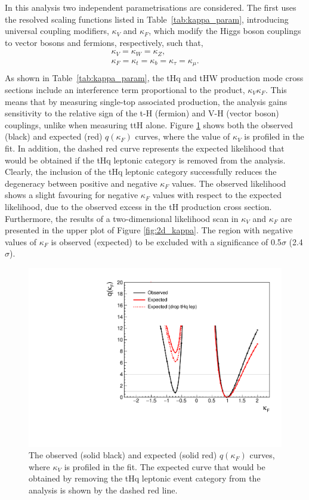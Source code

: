 In this analysis two independent parametrisations are considered. The first uses the resolved scaling functions listed in Table~\ref{tab:kappa_param}, introducing universal coupling modifiers, $\kappa_V$ and $\kappa_F$, which modify the Higgs boson couplings to vector bosons and fermions, respectively, such that,
\begin{equation}
    \begin{split}
        \kappa_V = \kappa_W = \kappa_Z, \\
        \kappa_F = \kappa_t = \kappa_b = \kappa_\tau = \kappa_\mu. \\
    \end{split}
\end{equation}
\noindent
As shown in Table~\ref{tab:kappa_param}, the tHq and tHW production mode cross sections include an interference term proportional to the product, $\kappa_V\kappa_F$. This means that by measuring single-top associated production, the analysis gains sensitivity to the relative sign of the t-H (fermion) and V-H (vector boson) couplings, unlike when measuring ttH alone. Figure \ref{fig:kappa_F} shows both the observed (black) and expected (red) $q(\kappa_F)$ curves, where the value of $\kappa_V$ is profiled in the fit. In addition, the dashed red curve represents the expected likelihood that would be obtained if the tHq leptonic category is removed from the analysis. Clearly, the inclusion of the tHq leptonic category successfully reduces the degeneracy between positive and negative $\kappa_F$ values. The observed likelihood shows a slight favouring for negative $\kappa_F$ values with respect to the expected likelihood, due to the observed excess in the tH production cross section. Furthermore, the results of a two-dimensional likelihood scan in $\kappa_V$ and $\kappa_F$ are presented in the upper plot of Figure \ref{fig:2d_kappa}. The region with negative values of $\kappa_F$ is observed (expected) to be excluded with a significance of 0.5$\sigma$ (2.4$\sigma$).

\begin{figure}[htb!]
  \centering
  \includegraphics[width=.6\textwidth]{Figures/hgg_results/profile1D_kappa_F.pdf}
  \caption[Observed and expected likelihood curves for $\kappa_F$]
  {
    The observed (solid black) and expected (solid red) $q(\kappa_F)$ curves, where $\kappa_V$ is profiled in the fit. The expected curve that would be obtained by removing the tHq leptonic event category from the analysis is shown by the dashed red line.
  }
  \label{fig:kappa_F}
\end{figure}

